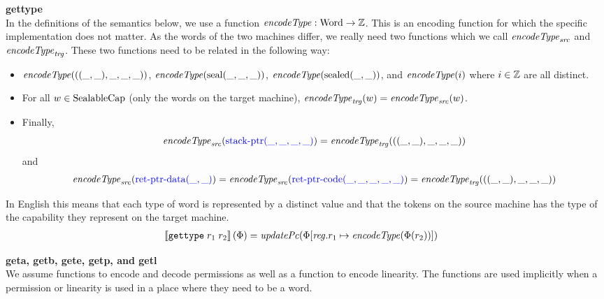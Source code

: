 \documentclass[a4paper]{article}
\begin{document}
\noindent\textbf{gettype}\\
In the definitions of the semantics below, we use a function $\encType{} : \Word \rightarrow \ints$. This is an encoding function for which the specific implementation does not matter. As the words of the two machines differ, we really need two functions which we call $\encType{}_{\var{src}}$ and $\encType{}_{\var{trg}}$. These two functions need to be related in the following way:
\begin{itemize}
\item $\encType{}(((\_,\_),\_,\_,\_))$, $\encType{}(\seal{\_,\_,\_})$, $\encType{}(\sealed{\_,\_})$, and $\encType{}(i)$ where $i\in\mathbb{Z}$ are all distinct.
\item For all $w \in \mathrm{SealableCap}$ (only the words on the target machine), $\encType{}_{\var{trg}}(w) = \encType{}_{\var{src}}(w)$.
\item Finally, 
\[
\encType{}_{\var{src}}(\src{\stkptr{\_,\_,\_,\_}}) = \encType{}_{\var{trg}}(((\_,\_),\_,\_,\_))
\]
 and 
\[
\encType{}_{\var{src}}(\src{\retptrd(\_,\_)}) = \encType{}_{\var{src}}(\src{\retptrc(\_,\_,\_,\_,\_)}) = \encType{}_{\var{trg}}(((\_,\_),\_,\_,\_))
\]
\end{itemize}
In English this means that each type of word is represented by a distinct value and that the tokens on the source machine has the type of the capability they represent on the target machine.
\begin{align*}
  \sem{\tisptr{r_1}{r_2}}(\Phi) = & \; \updPcAddr{}(\Phi\updReg{r_1}{\encType{\Phi(r_2)}})
\end{align*}


\noindent\textbf{geta, getb, gete, getp, and getl}\\
We assume functions to encode and decode permissions as well as a function to encode linearity. The functions are used implicitly when a permission or linearity is used in a place where they need to be a word.
\end{document}
